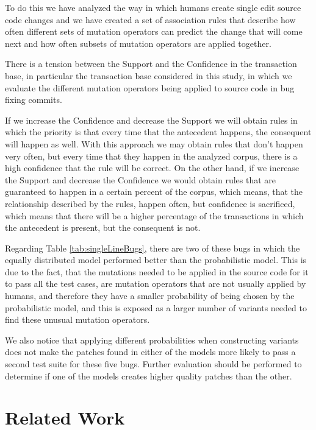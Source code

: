 \documentclass[conference]{IEEEtran}
\begin{document}
To do this we have analyzed the way in which humans create single edit 
source code changes and we have created a set of association rules that describe 
how often different sets of mutation operators can predict the change that will 
come next and how often subsets of mutation operators are applied together.

There is a tension between the Support and the Confidence in the transaction 
base, in particular the transaction base considered in this study, in which we 
evaluate the different mutation operators being applied to source code in bug 
fixing commits. 

If we increase the Confidence and decrease the Support we will obtain rules in 
which the priority is that every time that the antecedent happens, the 
consequent will happen as well. With this approach we may obtain rules that 
don't happen very often, but every time that they happen in the analyzed corpus, 
there is a high confidence that the rule will be correct. On the other hand, if 
we increase the Support and decrease the Confidence we would obtain rules that 
are guaranteed to happen in a certain percent of the corpus, which means, that 
the relationship described by the rules, happen often, but confidence is 
sacrificed, which means that there will be a higher percentage of the 
transactions in which the antecedent is present, but the consequent is not. 

Regarding Table \ref{tab:singleLineBugs}, there are two of these bugs in which the equally distributed model performed better than the probabilistic model. This is due to the fact, that the mutations needed to be applied in the source code for it to pass all the test cases, are mutation operators that are not usually applied by humans, and therefore they have a smaller probability of being chosen by the probabilistic model, and this is exposed as a larger number of variants needed to find these unusual mutation operators.

We also notice that applying different probabilities when constructing variants does not make the patches found in either of the models more likely to pass a second test suite for these five bugs. Further evaluation should be performed to determine if one of the models creates higher quality patches than the other.



\section{Related Work} \label{relatedWork}
\end{document}

